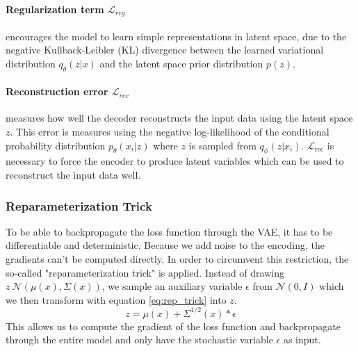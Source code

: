\paragraph{Regularization term $\mathcal{L}_{reg}$} encourages the model to learn simple representations in latent space, due to the negative Kullback-Leibler (KL) divergence between the learned variational distribution $q_\theta(z|x)$ and the latent space prior distribution $p(z)$.



\paragraph{Reconstruction error $\mathcal{L}_{rec}$} measures how well the decoder reconstructs the input data using the latent space $z$.
This error is measures using the negative log-likelihood of the conditional probability distribution $p_\theta(x_i|z)$ where $z$ is sampled from $q_\phi(z | x_i)$.
$\mathcal{L}_{\mathrm{rec}}$ is necessary to force the encoder to produce latent variables which can be used to reconstruct the input data well.




\subsubsection{Reparameterization Trick}
To be able to backpropagate the loss function through the VAE, it has to be differentiable and deterministic.
Because we add noise to the encoding, the gradients can't be computed directly. In order to circumvent this restriction, the so-called "reparameterization trick" is applied.
Instead of drawing $z ~ \mathcal{N}(\mu(x), \Sigma(x))$, we sample an auxiliary variable $\epsilon$ from $\mathcal{N}(0, I)$ which we then transform with equation \ref{eq:rep_trick} into $z$.
\begin{equation}
  \label{eq:rep_trick}
  z = \mu(x) + \Sigma^{1/2}(x)*\epsilon
\end{equation}
This allows us to compute the gradient of the loss function and backpropagate through the entire model and only have the stochastic variable $\epsilon$ as input.\\\\

